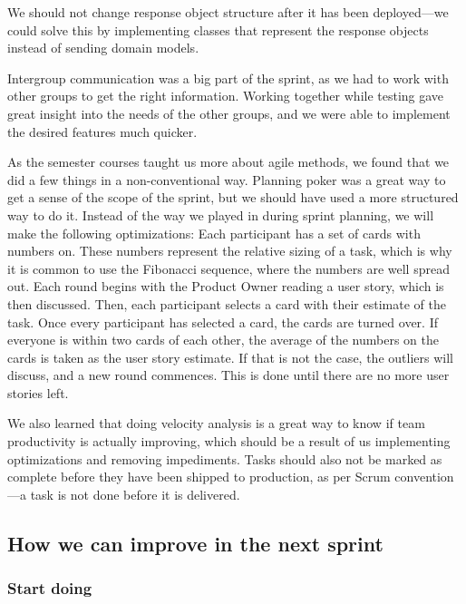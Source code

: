 We should not change response object structure after it has been deployed---we could solve this by implementing classes that represent the response objects instead of sending domain models. 

Intergroup communication was a big part of the sprint, as we had to work with other groups to get the right information. 
Working together while testing gave great insight into the needs of the other groups, and we were able to implement the desired features much quicker.

As the semester courses taught us more about agile methods, we found that we did a few things in a non-conventional way. Planning poker was a great way to get a sense of the scope of the sprint, but we should have used a more structured way to do it. 
Instead of the way we played in during sprint planning, we will make the following optimizations:
Each participant has a set of cards with numbers on. These numbers represent the relative sizing of a task, which is why it is common to use the Fibonacci sequence, where the numbers are well spread out.
Each round begins with the Product Owner reading a user story, which is then discussed. Then, each participant selects a card with their estimate of the task. Once every participant has selected a card, the cards are turned over. If everyone is within two cards of each other, the average of the numbers on the cards is taken as the user story estimate. If that is not the case, the outliers will discuss, and a new round commences.
This is done until there are no more user stories left\cite{sutherlandScrumArtDoing2014}.


We also learned that doing velocity analysis is a great way to know if team productivity is actually improving, which should be a result of us implementing optimizations and removing impediments.
Tasks should also not be marked as complete before they have been shipped to production, as per Scrum convention---a task is not done before it is delivered\cite{sutherlandScrumArtDoing2014}.

\subsection{How we can improve in the next sprint}

\subsubsection{Start doing}

